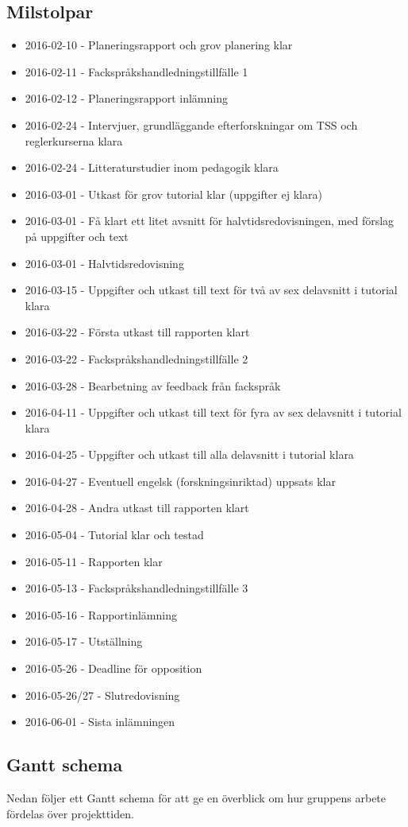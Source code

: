 \documentclass{article}
\begin{document}
\subsection{Milstolpar}
\begin{itemize}
 \item 2016-02-10 - Planeringsrapport och grov planering klar
 \item 2016-02-11 - Fackspråkshandledningstillfälle 1
 \item 2016-02-12 - Planeringsrapport inlämning
 \item 2016-02-24 - Intervjuer, grundläggande efterforskningar om TSS och reglerkurserna klara
 \item 2016-02-24 - Litteraturstudier inom pedagogik klara
 \item 2016-03-01 - Utkast för grov tutorial klar (uppgifter ej klara)
 \item 2016-03-01 - Få klart ett litet avsnitt för halvtidsredovisningen, med förslag på uppgifter och text
 \item 2016-03-01 - Halvtidsredovisning
 \item 2016-03-15 - Uppgifter och utkast till text för två av sex delavsnitt i tutorial klara
 \item 2016-03-22 - Första utkast till rapporten klart
 \item 2016-03-22 - Fackspråkshandledningstillfälle 2
 \item 2016-03-28 - Bearbetning av feedback från fackspråk
 \item 2016-04-11 - Uppgifter och utkast till text för fyra av sex delavsnitt i tutorial klara
 \item 2016-04-25 - Uppgifter och utkast till alla delavsnitt i tutorial klara
 \item 2016-04-27 - Eventuell engelsk (forskningsinriktad) uppsats klar
 \item 2016-04-28 - Andra utkast till rapporten klart
 \item 2016-05-04 - Tutorial klar och testad
 \item 2016-05-11 - Rapporten klar
 \item 2016-05-13 - Fackspråkshandledningstillfälle 3
 \item 2016-05-16 - Rapportinlämning
 \item 2016-05-17 - Utställning
 \item 2016-05-26 - Deadline för opposition
 \item 2016-05-26/27 - Slutredovisning
 \item 2016-06-01 - Sista inlämningen
\end{itemize}

\newpage
\subsection{Gantt schema}
Nedan följer ett Gantt schema för att ge en överblick om hur gruppens arbete fördelas över projekttiden.
\begin{figure}
    \centering
    
\end{figure}
\newpage

\printbibliography
\end{document}
